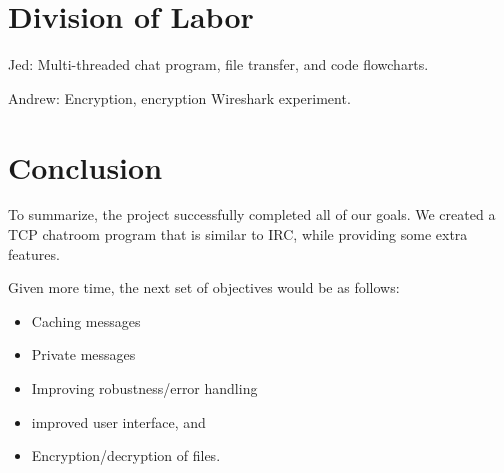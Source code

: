 \documentclass{article}
\begin{document}
\section{Division of Labor}

Jed: Multi-threaded chat program, file transfer, and code flowcharts. 

Andrew: Encryption, encryption Wireshark experiment. 

\section{Conclusion}

To summarize, the project successfully completed all of our goals. We created a TCP chatroom program that is similar to IRC, while providing some extra features. 

Given more time, the next set of objectives would be as follows: 
\begin{itemize}
  \item Caching messages
  \item Private messages
  \item Improving robustness/error handling
  \item improved user interface, and
  \item Encryption/decryption of files. 
\end{itemize}





\end{document}
